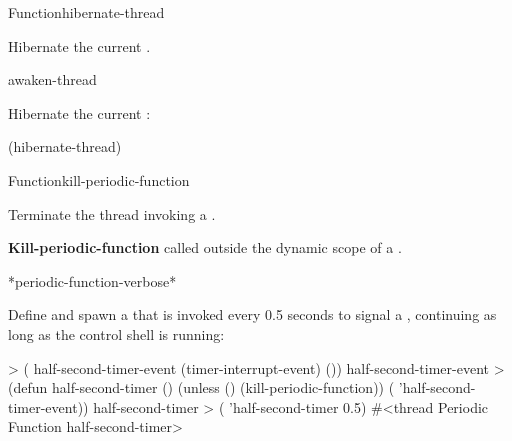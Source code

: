 
\begin{functiondoc}{Function}{hibernate-thread}{\noargs{}}
%

\fnsyntax

\fnpurpose Hibernate the current .

\fnpackage {}

\fnmodule {}

\fnerrors
\nothreads{}

\begin{alsos}{awaken-thread}
\end{alsos}

\fnexample
Hibernate the current :
%
\W\supp
\begin{example}
  (hibernate-thread)
\end{example}

\end{functiondoc}


\begin{functiondoc}{Function}{kill-periodic-function}{\noargs{}}
%
%

\fnsyntax

\fnpurpose Terminate the thread invoking a .

\fnpackage {}

\fnmodule {}

\fnerrors
\nothreads{}

\textbf{Kill-periodic-function} called outside the dynamic scope of a
.

\begin{alsos}{*periodic-function-verbose*}
\end{alsos}

%
%
%
%
\fnexample
Define and spawn a  that is invoked every 0.5 seconds
to signal a , continuing as long as the
control shell is running:
%
\W\supp
\begin{example}
> ( half-second-timer-event (timer-interrupt-event)
    ())
half-second-timer-event
> (defun half-second-timer ()
    (unless ()
      (kill-periodic-function))
    ( 'half-second-timer-event))
half-second-timer
> ( 'half-second-timer 0.5)
#<thread Periodic Function half-second-timer>
\end{example}

\end{functiondoc}


